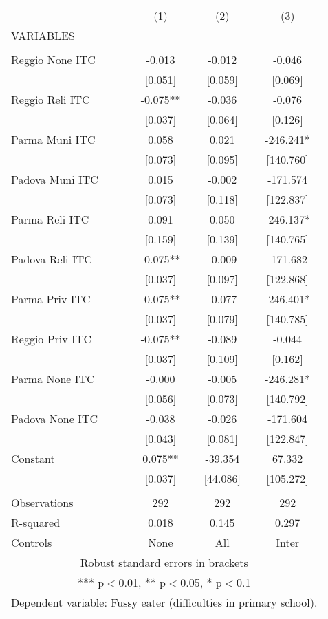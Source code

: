 \begin{tabular}{lccc} \hline
 & (1) & (2) & (3) \\
VARIABLES &  &  &  \\ \hline
 &  &  &  \\
Reggio None ITC & -0.013 & -0.012 & -0.046 \\
 & [0.051] & [0.059] & [0.069] \\
Reggio Reli ITC & -0.075** & -0.036 & -0.076 \\
 & [0.037] & [0.064] & [0.126] \\
Parma Muni ITC & 0.058 & 0.021 & -246.241* \\
 & [0.073] & [0.095] & [140.760] \\
Padova Muni ITC & 0.015 & -0.002 & -171.574 \\
 & [0.073] & [0.118] & [122.837] \\
Parma Reli ITC & 0.091 & 0.050 & -246.137* \\
 & [0.159] & [0.139] & [140.765] \\
Padova Reli ITC & -0.075** & -0.009 & -171.682 \\
 & [0.037] & [0.097] & [122.868] \\
Parma Priv ITC & -0.075** & -0.077 & -246.401* \\
 & [0.037] & [0.079] & [140.785] \\
Reggio Priv ITC & -0.075** & -0.089 & -0.044 \\
 & [0.037] & [0.109] & [0.162] \\
Parma None ITC & -0.000 & -0.005 & -246.281* \\
 & [0.056] & [0.073] & [140.792] \\
Padova None ITC & -0.038 & -0.026 & -171.604 \\
 & [0.043] & [0.081] & [122.847] \\
Constant & 0.075** & -39.354 & 67.332 \\
 & [0.037] & [44.086] & [105.272] \\
 &  &  &  \\
Observations & 292 & 292 & 292 \\
R-squared & 0.018 & 0.145 & 0.297 \\
 Controls & None & All & Inter \\ \hline
\multicolumn{4}{c}{ Robust standard errors in brackets} \\
\multicolumn{4}{c}{ *** p$<$0.01, ** p$<$0.05, * p$<$0.1} \\
\multicolumn{4}{c}{ Dependent variable: Fussy eater (difficulties in primary school).} \\
\end{tabular}

